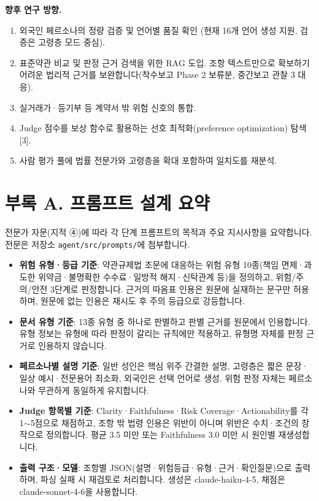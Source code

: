 \documentclass[10pt,a4paper]{article}
\begin{document}
\textbf{향후 연구 방향.}
\begin{enumerate}
\item 외국인 페르소나의 정량 검증 및 언어별 품질 확인 (현재 16개 언어 생성 지원, 검증은 고령층 모드 중심).
\item 표준약관 비교 및 판정 근거 검색을 위한 RAG 도입. 조항 텍스트만으로 확보하기 어려운 법리적 근거를 보완합니다(착수보고 Phase 2 보류분, 중간보고 관찰 3 대응).
\item 실거래가·등기부 등 계약서 밖 위험 신호의 통합.
\item Judge 점수를 보상 함수로 활용하는 선호 최적화(preference optimization) 탐색[3].
\item 사람 평가 풀에 법률 전문가와 고령층을 확대 포함하여 일치도를 재분석.
\end{enumerate}

\section*{부록 A. 프롬프트 설계 요약}
전문가 자문(지적 ④)에 따라 각 단계 프롬프트의 목적과 주요 지시사항을 요약합니다. 전문은 저장소 \nolinkurl{agent/src/prompts/}에 첨부합니다.
\begin{itemize}
\item \textbf{위험 유형·등급 기준}: 약관규제법 조문에 대응하는 위험 유형 10종(책임 면제·과도한 위약금·불명확한 수수료·일방적 해지·신탁관계 등)을 정의하고, 위험/주의/안전 3단계로 판정합니다. 근거의 따옴표 인용은 원문에 실재하는 문구만 허용하며, 원문에 없는 인용은 재시도 후 주의 등급으로 강등합니다.
\item \textbf{문서 유형 기준}: 13종 유형 중 하나로 판별하고 판별 근거를 원문에서 인용합니다. 유형 정보는 유형에 따라 판정이 갈리는 규칙에만 적용하고, 유형명 자체를 판정 근거로 인용하지 않습니다.
\item \textbf{페르소나별 설명 기준}: 일반 성인은 핵심 위주 간결한 설명, 고령층은 짧은 문장·일상 예시·전문용어 최소화, 외국인은 선택 언어로 생성. 위험 판정 자체는 페르소나와 무관하게 동일하게 유지합니다.
\item \textbf{Judge 항목별 기준}: Clarity·Faithfulness·Risk Coverage·Actionability를 각 1$\sim$5점으로 채점하고, 조항 밖 법령 인용은 위반이 아니며 위반은 수치·조건의 창작으로 정의합니다. 평균 3.5 미만 또는 Faithfulness 3.0 미만 시 원인별 재생성합니다.
\item \textbf{출력 구조·모델}: 조항별 JSON(설명·위험등급·유형·근거·확인질문)으로 출력하며, 파싱 실패 시 재검토로 처리합니다. 생성은 claude-haiku-4-5, 채점은 claude-sonnet-4-6을 사용합니다.
\end{itemize}
\end{document}
